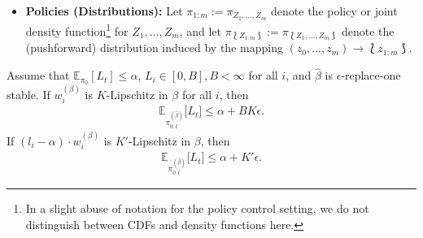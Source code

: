 \begin{itemize}
    \item \textbf{Policies (Distributions):} Let $\pi_{1:m}:=\pi_{Z_1, ..., Z_m}$ denote the policy or joint density function\footnote{In a slight abuse of notation for the policy control setting, we do not distinguish between CDFs and density functions here.} for $Z_1, ..., Z_m$, and let $\pi_{\lbag Z_{1:m}\rbag}:=\pi_{\lbag Z_1, ..., Z_m\rbag}$ denote the (pushforward) distribution induced by the mapping $(z_0, ..., z_m)\rightarrow \lbag z_{1:m} \rbag$. 
\end{itemize}





\begin{theorem}
    Assume that $\mathbb{E}_{\pi_0}[L_t]\leq \alpha$,  $L_i\in[0,B], B<\infty$ for all $i$, and $\hat\beta$ is $\epsilon$-replace-one stable. If $w_i^{(\beta)}$ is $K$-Lipschitz in $\beta$ for all $i$, then
    \begin{align*}
        \mathbb{E}_{\pi_{0:t}^{(\hat\beta)}}\big[L_{t} \big] \leq \alpha + BK\epsilon.
    \end{align*}
    If $(l_i - \alpha) \cdot w_i^{(\beta)}$ is $K'$-Lipschitz in $\beta$, then
    \begin{align*}
        \mathbb{E}_{\pi_{0:t}^{(\hat\beta)}}\big[L_{t} \big] \leq \alpha + K'\epsilon.
    \end{align*}
\end{theorem}

